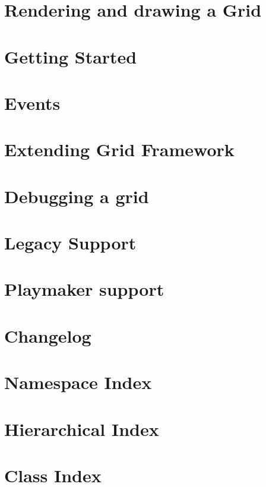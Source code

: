 \documentclass[twoside]{book}
\newcommand{\+}{\discretionary{\mbox{\scriptsize$\hookleftarrow$}}{}{}}
\begin{document}
\chapter{Rendering and drawing a Grid}
\label{rendering_drawing}
\hypertarget{rendering_drawing}{}

\chapter{Getting Started}
\label{getting_started}
\hypertarget{getting_started}{}

\chapter{Events}
\label{events}
\hypertarget{events}{}

\chapter{Extending Grid Framework}
\label{extending}
\hypertarget{extending}{}

\chapter{Debugging a grid}
\label{debugging}
\hypertarget{debugging}{}

\chapter{Legacy Support}
\label{legacy_support}
\hypertarget{legacy_support}{}

\chapter{Playmaker support}
\label{playmaker_support}
\hypertarget{playmaker_support}{}

\chapter{Changelog}
\label{changelog}
\hypertarget{changelog}{}

\chapter{Namespace Index}

\chapter{Hierarchical Index}

\chapter{Class Index}

\end{document}
